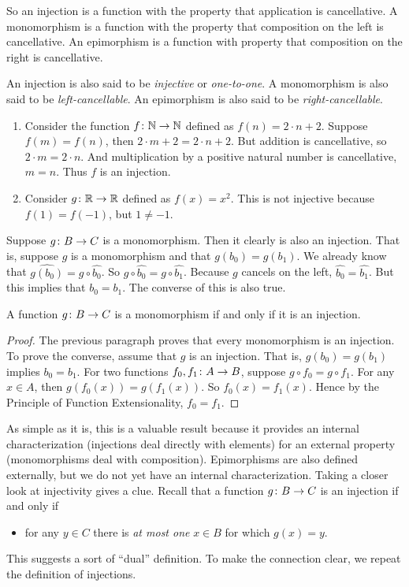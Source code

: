 So an injection is a function with the property that application is cancellative.
A monomorphism is a function with the property that composition on the left is cancellative. 
An epimorphism is a function with property that composition on the right is cancellative.

An injection is also said to be \emph{injective} or \emph{one-to-one}.
A monomorphism is also said to be \emph{left-cancellable}. 
An epimorphism is also said to be \emph{right-cancellable}.

\printbreak
\begin{example}
	\begin{enumerate}
		\item Consider the function ${f}\colon{\mathbb N}\to{\mathbb N}$ defined as $f(n) = 2\cdot n  + 2$.
		Suppose $f(m)=f(n)$, then $2\cdot m + 2=2\cdot n+ 2$. 
		But addition is cancellative, so $2\cdot m=2\cdot n$. 
		And multiplication by a positive natural number is cancellative, $m=n$.
		Thus $f$ is an injection.
		\item Consider ${g}\colon{\mathbb R}\to{\mathbb R}$ defined as $f(x) = x^2$. 
		This is not injective because $f(1)=f(-1)$, but $1\neq -1$. 
	\end{enumerate}
\end{example}

Suppose ${g}\colon{B}\to{C}$ is a monomorphism. 
Then it clearly is also an injection. 
That is, suppose $g$ is a monomorphism and that $g(b_0)=g(b_1)$. 
We already know that $\widehat{g(b_0)} = g\circ \widehat{b_0}$.
So $g\circ \widehat{b_0} = g\circ \widehat{b_1}$.
Because $g$ cancels on the left, $\widehat{b_0} = \widehat{b_1}$.
But this implies that $b_0=b_1$.
The converse of this is also true.

\begin{lemma}
	A function ${g}\colon{B}\to{C}$ is a monomorphism if and only if it is an injection.
	\begin{proof}
		The previous paragraph proves that every monomorphism is an injection. To prove the converse, assume that $g$ is an injection. 
		That is, $g(b_0)=g(b_1)$ implies $b_0=b_1$.
		For two functions ${f_0,f_1}\colon{A}\to{B}$, suppose $g\circ f_0=g\circ f_1$. 
		For any $x\in A$, then $g(f_0(x)) = g(f_1(x))$. So $f_0(x)=f_1(x)$. Hence by the Principle of Function Extensionality, $f_0=f_1$.
	\end{proof}
\end{lemma}

As simple as it is, this is a valuable result because it provides an internal characterization (injections deal directly with elements) for an external property (monomorphisms deal with composition). Epimorphisms are also defined externally, but we do not yet have an internal characterization. Taking a closer look at injectivity gives a clue.
Recall that a function ${g}\colon{B}\to{C}$ is an injection if and only if
\begin{itemize}
	\item for any $y\in C$ there is \emph{at most one} $x\in B$ for which $g(x)=y$.
\end{itemize}
This suggests a sort of ``dual'' definition. To make the connection clear, we repeat the definition of injections.

